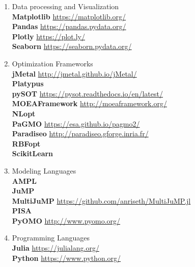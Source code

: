 \begin{enumerate}[label=\Alph*]
\item Data processing and Visualization \\
\textbf{Matplotlib} \url{https://matplotlib.org/} \\
\textbf{Pandas} \url{https://pandas.pydata.org/} \\
\textbf{Plotly} \url{https://plot.ly/} \\
\textbf{Seaborn} \url{https://seaborn.pydata.org/}

\item Optimization Frameworks\\
\textbf{jMetal} \url{http://jmetal.github.io/jMetal/} \\
\textbf{Platypus} \cite{platypus} \\
\textbf{pySOT} \url{https://pysot.readthedocs.io/en/latest/} \\
\textbf{MOEAFramework} \url{http://moeaframework.org/} \\
\textbf{NLopt} \cite{NLOPT} \\
\textbf{PaGMO} \url{https://esa.github.io/pagmo2/} \\
\textbf{Paradiseo} \url{http://paradiseo.gforge.inria.fr/} \\
\textbf{RBFopt} \cite{RBFOPT} \\ 
\textbf{ScikitLearn} \cite{scikit-learn} 

\item Modeling Languages  \\
\textbf{AMPL} \cite{AMPL} \\
\textbf{JuMP} \cite{DunningHuchetteLubin2017} \\
\textbf{MultiJuMP} \url{https://github.com/anriseth/MultiJuMP.jl} \\
\textbf{PISA} \cite{PISA2003} \\
\textbf{PyOMO} \url{http://www.pyomo.org/}

\item Programming Languages \\
\textbf{Julia} \url{https://julialang.org/} \\
\textbf{Python} \url{https://www.python.org/}

\end{enumerate}